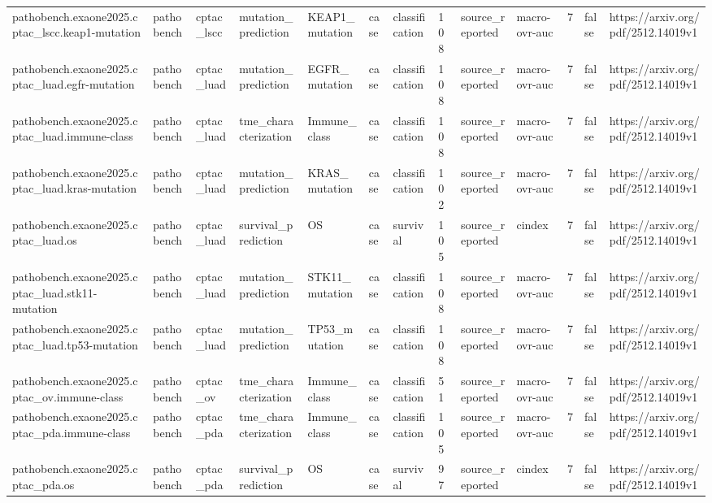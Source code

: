 \begin{longtable}{lllllllllllll}
pathobench.exaone2025.cptac\_lscc.keap1-mutation & pathobench & cptac\_lscc & mutation\_prediction & KEAP1\_mutation & case & classification & 108 & source\_reported & macro-ovr-auc & 7 & false & https://arxiv.org/pdf/2512.14019v1 \\
pathobench.exaone2025.cptac\_luad.egfr-mutation & pathobench & cptac\_luad & mutation\_prediction & EGFR\_mutation & case & classification & 108 & source\_reported & macro-ovr-auc & 7 & false & https://arxiv.org/pdf/2512.14019v1 \\
pathobench.exaone2025.cptac\_luad.immune-class & pathobench & cptac\_luad & tme\_characterization & Immune\_class & case & classification & 108 & source\_reported & macro-ovr-auc & 7 & false & https://arxiv.org/pdf/2512.14019v1 \\
pathobench.exaone2025.cptac\_luad.kras-mutation & pathobench & cptac\_luad & mutation\_prediction & KRAS\_mutation & case & classification & 102 & source\_reported & macro-ovr-auc & 7 & false & https://arxiv.org/pdf/2512.14019v1 \\
pathobench.exaone2025.cptac\_luad.os & pathobench & cptac\_luad & survival\_prediction & OS & case & survival & 105 & source\_reported & cindex & 7 & false & https://arxiv.org/pdf/2512.14019v1 \\
pathobench.exaone2025.cptac\_luad.stk11-mutation & pathobench & cptac\_luad & mutation\_prediction & STK11\_mutation & case & classification & 108 & source\_reported & macro-ovr-auc & 7 & false & https://arxiv.org/pdf/2512.14019v1 \\
pathobench.exaone2025.cptac\_luad.tp53-mutation & pathobench & cptac\_luad & mutation\_prediction & TP53\_mutation & case & classification & 108 & source\_reported & macro-ovr-auc & 7 & false & https://arxiv.org/pdf/2512.14019v1 \\
pathobench.exaone2025.cptac\_ov.immune-class & pathobench & cptac\_ov & tme\_characterization & Immune\_class & case & classification & 51 & source\_reported & macro-ovr-auc & 7 & false & https://arxiv.org/pdf/2512.14019v1 \\
pathobench.exaone2025.cptac\_pda.immune-class & pathobench & cptac\_pda & tme\_characterization & Immune\_class & case & classification & 105 & source\_reported & macro-ovr-auc & 7 & false & https://arxiv.org/pdf/2512.14019v1 \\
pathobench.exaone2025.cptac\_pda.os & pathobench & cptac\_pda & survival\_prediction & OS & case & survival & 97 & source\_reported & cindex & 7 & false & https://arxiv.org/pdf/2512.14019v1 \\

\end{longtable}

